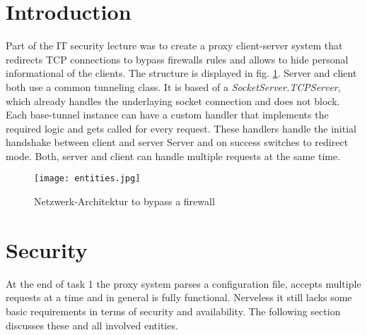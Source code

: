 \documentclass[12pt, a4paper]{scrartcl}
\begin{document}


\tableofcontents
\newpage
{}
\setcounter{lastroman}{\value{page}}

\pagestyle{plain}
\maketitle

\section{Introduction}
Part of the IT security lecture was to create a proxy client-server system that redirects TCP connections to bypass firewalls rules and allows to hide personal informational of the clients. The structure is displayed in fig. \ref{fig::arch}. \newline
Server and client both use a common tunneling class. It is based of a \textit{SocketServer.TCPServer}, which already handles the underlaying socket connection and does not block. Each base-tunnel instance can have a custom handler that implements the required logic and gets called for every request. These handlers handle the initial handshake between client and server Server and on success switches to redirect mode. Both, server and client can handle multiple requests at the same time.

\begin{figure}[H]
    \centering
    \texttt{[image: entities.jpg]}
    \caption{Netzwerk-Architektur to bypass a firewall}
    \label{fig::arch}
\end{figure}

\newpage
\section{Security}
At the end of task 1 the proxy system parses a configuration file, accepts multiple requests at a time and in general is fully functional. Nerveless it still lacks some basic requirements in terms of security and availability. The following section discusses these and all involved entities.
\end{document}
